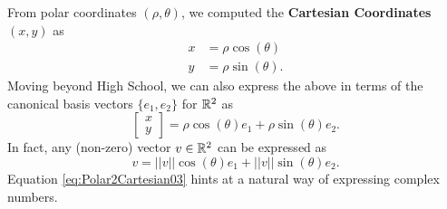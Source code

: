 From polar coordinates $(\rho, \theta)$, we computed the \textbf{Cartesian Coordinates} $(x,y)$ as
\begin{equation}
    \label{eq:Polar2Cartesian}
    \begin{aligned}
    x&= \rho \cos(\theta)\\
    y&= \rho \sin(\theta).
    \end{aligned}
\end{equation}
Moving beyond High School, we can also express the above in terms of the canonical basis vectors $\{e_1, e_2 \}$ for $\mathbb R^2$ as
\begin{equation}
    \label{eq:Polar2Cartesian02}
\left[\begin{array}{c} x \\ y \end{array}  \right] = \rho \cos(\theta) e_1 +  \rho \sin(\theta) e_2.
\end{equation}
In fact, any (non-zero) vector $v\in \mathbb R^2$ can be expressed as 
\begin{equation}
    \label{eq:Polar2Cartesian03}
v = ||v|| \cos(\theta) e_1 +  ||v||\sin(\theta) e_2.
\end{equation}
Equation \eqref{eq:Polar2Cartesian03} hints at a natural way of expressing complex numbers.

